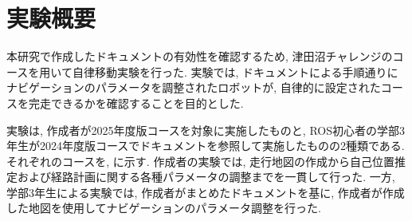 \section{実験概要}
本研究で作成したドキュメントの有効性を確認するため, 津田沼チャレンジ\cite{tsudachare}のコースを用いて自律移動実験を行った. 
実験では, ドキュメントによる手順通りにナビゲーションのパラメータを調整されたロボットが, 自律的に設定されたコースを完走できるかを確認することを目的とした. 

実験は, 作成者が2025年度版コースを対象に実施したものと, ROS初心者の学部3年生が2024年度版コースでドキュメントを参照して実施したものの2種類である. 
それぞれのコースを, に示す.
作成者の実験では, 走行地図の作成から自己位置推定および経路計画に関する各種パラメータの調整までを一貫して行った. 
一方, 学部3年生による実験では, 作成者がまとめたドキュメントを基に, 作成者が作成した地図を使用してナビゲーションのパラメータ調整を行った. 

